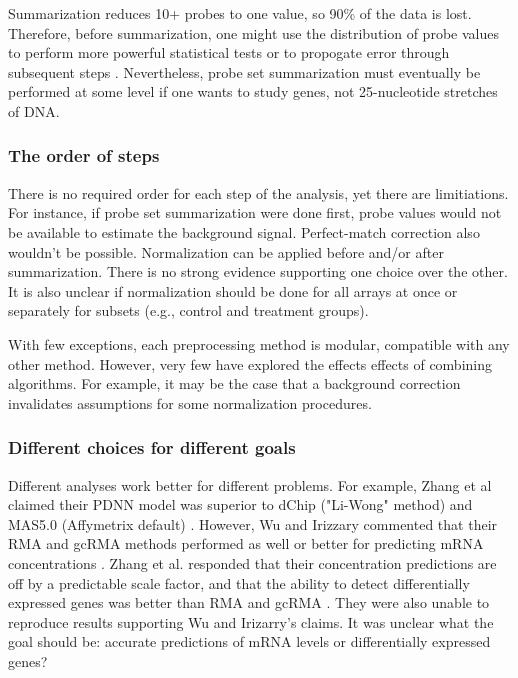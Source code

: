 Summarization reduces 10+ probes to one value, so 90\% of the data
is lost. Therefore, before summarization, one might use
the distribution of probe values to perform more powerful statistical tests or to propogate
error through subsequent steps \cite{Milo:2003tt,Liu:2005ey}.
Nevertheless, probe set summarization must eventually be performed
at some level if one wants to study genes, not 25-nucleotide stretches of DNA.

\subsubsection{The order of steps}
There is no required order for each step of the analysis,
yet there are limitiations. For instance, if probe set summarization were done first,
probe values would not be available to estimate the background signal. 
Perfect-match correction also wouldn't
be possible. Normalization can be applied before and/or after summarization.
There is no strong evidence supporting one choice over the other.
It is also unclear if normalization should be done for all arrays at once
or separately for subsets (e.g., control and treatment groups).

With few exceptions, each preprocessing method is modular, compatible
with any other method. However, very few have explored
the effects effects of combining algorithms.
For example, it may be the case that a background correction
invalidates assumptions for some normalization procedures.

\subsubsection{Different choices for different goals}\label{introjtm:difgoals}

Different analyses work better for different problems.
For example, Zhang et al claimed their PDNN model 
was superior to dChip ("Li-Wong" method)
and MAS5.0 (Affymetrix default) \cite{Zhang:2003to}.
However, Wu and Irizzary commented that their
RMA and gcRMA methods performed as well or better for predicting
mRNA concentrations \cite{Wu:2004ul}.
Zhang et al. responded that their concentration predictions
are off by a predictable scale factor, and that
the ability to detect differentially expressed genes
was better than RMA and gcRMA \cite{Zhang:2004tl}. They were also unable to
reproduce results supporting Wu and Irizarry's claims.
It was unclear what the goal should be: accurate predictions of mRNA levels or
differentially expressed genes?


